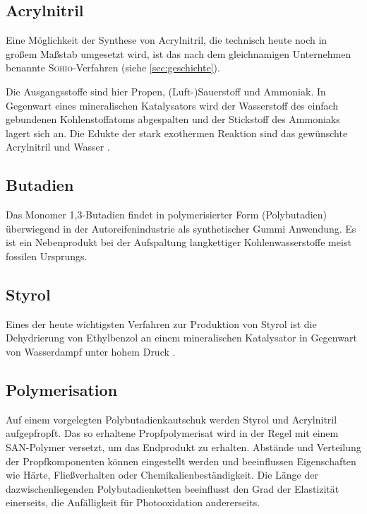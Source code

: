         \subsection{Acrylnitril}
            Eine Möglichkeit der Synthese von Acrylnitril, die technisch heute noch in großem Maßstab umgesetzt wird, ist das nach dem gleichnamigen
            Unternehmen benannte \textsc{Sohio}-Verfahren (siehe \cref{sec:geschichte}).

            Die Ausgangsstoffe sind hier Propen, (Luft-)Sauerstoff und Ammoniak. In Gegenwart eines mineralischen Katalysators wird der Wasserstoff
            des einfach gebundenen Kohlenstoffatoms abgespalten und der Stickstoff des Ammoniaks lagert sich an. Die Edukte der
            stark exothermen Reaktion sind das gewünschte Acrylnitril und Wasser \cite{sohio.process.patent.1959.9201957}.

        \subsection{Butadien}
            Das Monomer 1,3-Butadien findet in polymerisierter Form (Polybutadien) überwiegend in der Autoreifenindustrie als synthetischer Gummi
            Anwendung. Es ist ein Nebenprodukt bei der Aufspaltung langkettiger Kohlenwasserstoffe meist fossilen Ursprungs.

        \subsection{Styrol}
            Eines der heute wichtigsten Verfahren zur Produktion von Styrol ist die Dehydrierung von Ethylbenzol
            an einem mineralischen Katalysator in Gegenwart von Wasserdampf unter hohem Druck \cite{styrol.synthese.Liquid.Phase.Alkylation.of.Benzene.Bellussi.1995}.

        \subsection{Polymerisation}
            Auf einem vorgelegten Polybutadienkautschuk werden Styrol und Acrylnitril aufgepfropft. Das so erhaltene Propfpolymerisat
            wird in der Regel mit einem SAN-Polymer versetzt, um das Endprodukt zu erhalten. Abstände und Verteilung der
            Propfkomponenten können eingestellt werden und beeinflussen Eigenschaften wie Härte, Fließverhalten oder
            Chemikalienbeständigkeit. Die Länge der dazwischenliegenden Polybutadienketten beeinflusst den Grad der Elastizität
            einerseits, die Anfälligkeit für Photooxidation andererseits\cite{Domininghaus.1998.Kunststoffe.und.ihre.Eigenschaften}.
        
